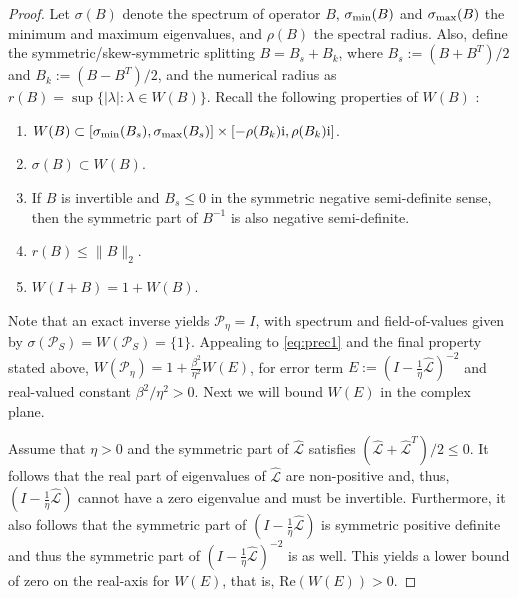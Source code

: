 \documentclass[review]{siamart}
\begin{document}
\begin{proof}
Let $\sigma(B)$ denote the spectrum of operator $B$, $\sigma_{\textnormal{min}}(B)$
and $\sigma_{\textnormal{max}}(B)$ the minimum and maximum eigenvalues, and $\rho(B)$
the spectral radius. Also, define the symmetric/skew-symmetric splitting
$B = B_s + B_k$, where $B_s := (B+B^T)/2$ and $B_k := (B - B^T)/2$, and the numerical
radius as $r(B) = \sup \{ |\lambda| : \lambda \in W(B) \}$. Recall
the following properties of $W(B)$ \cite{gustafson1997numerical}:
%
\begin{enumerate}
	\item $W(B)\subset [\sigma_{\textnormal{min}}(B_s), \sigma_{\textnormal{max}}(B_s)] \times
	[-\rho(B_k)\mathrm{i}, \rho(B_k)\mathrm{i}]$.

	\item $\sigma(B) \subset W(B)$.

	\item If $B$ is invertible and $B_s \leq 0$ in the symmetric negative semi-definite
	sense, then the symmetric part of $B^{-1}$ is also negative semi-definite.

	\item $r(B) \leq \|B\|_2$.

	\item $W(I + B) = 1 + W(B)$.
\end{enumerate}
%
Note that an exact inverse yields $\mathcal{P}_\eta = I$, with spectrum
and field-of-values given by $\sigma(\mathcal{P}_S) = W(\mathcal{P}_S) = \{1\}$.
Appealing to \eqref{eq:prec1} and the final property stated above, $W(\mathcal{P}_\eta)
= 1 + \tfrac{\beta^2}{\eta^2}W(E)$, for error term $E := (I - \tfrac{1}{\eta}\widehat{\mathcal{L}})^{-2}$
and real-valued constant $\beta^2/\eta^2 > 0$. Next we will bound $W(E)$ in the complex plane.

Assume that $\eta > 0$ and the symmetric part of $\widehat{\mathcal{L}}$ satisfies
$(\widehat{\mathcal{L}}+\widehat{\mathcal{L}}^T)/2 \leq 0$.
It follows that the real part of eigenvalues of $\widehat{\mathcal{L}}$ are non-positive and,
thus, $(I - \tfrac{1}{\eta}\widehat{\mathcal{L}})$ cannot have a zero eigenvalue and must be
invertible. Furthermore, it also follows that the symmetric part of
$(I - \tfrac{1}{\eta}\widehat{\mathcal{L}})$ is symmetric positive definite and thus
the symmetric part of $(I - \tfrac{1}{\eta}\widehat{\mathcal{L}})^{-2}$ is as well.
This yields a lower bound of zero on the real-axis for $W(E)$, that is,
Re$(W(E)) > 0$. 


\end{proof}
\end{document}

